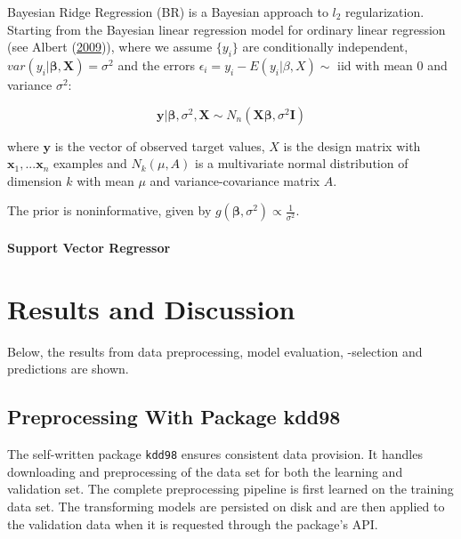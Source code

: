 \documentclass[
  11pt,
  a4paper,
  DIV=12,captions=tableheading,oneside,titlepage=firstiscover,abstracton]{scrreprt}
\begin{document}
Bayesian Ridge Regression (BR) is a Bayesian approach to \(l_2\) regularization. Starting from the Bayesian linear regression model for ordinary linear regression (see Albert (\protect\hyperlink{ref-albert2009bayesian}{2009})), where we assume \(\{y_i\}\) are conditionally independent, \(var(y_i|\mathbf{\beta},\mathbf{X}) = \sigma^2\) and the errors \(\epsilon_i = y_i - E(y_i|\beta,X) \sim\) iid with mean 0 and variance \(\sigma^2\):

\begin{equation}
\mathbf{y}|\mathbf{\beta},\sigma^2,\mathbf{X} \sim N_n(\mathbf{X \beta},\sigma^2 \mathbf{I})
\label{eq:bayesian-linear-model}
\end{equation}

where \(\mathbf{y}\) is the vector of observed target values, \(X\) is the design matrix with \(\mathbf{x}_1, ... \mathbf{x}_n\) examples and \(N_k(\mu, A)\) is a multivariate normal distribution of dimension \(k\) with mean \(\mu\) and variance-covariance matrix \(A\).

The prior is noninformative, given by \(g(\mathbf{\beta}, \sigma^2) \propto \frac{1}{\sigma^2}\).

\hypertarget{support-vector-regressor}{%
\subsubsection{Support Vector Regressor}\label{support-vector-regressor}}

\hypertarget{results-and-discussion}{%
\chapter{Results and Discussion}\label{results-and-discussion}}

Below, the results from data preprocessing, model evaluation, -selection and predictions are shown.

\hypertarget{preprocessing-with-package-kdd98}{%
\section{Preprocessing With Package kdd98}\label{preprocessing-with-package-kdd98}}

The self-written package \texttt{kdd98} ensures consistent data provision. It handles downloading and preprocessing of the data set for both the learning and validation set. The complete preprocessing pipeline is first learned on the training data set. The transforming models are persisted on disk and are then applied to the validation data when it is requested through the package's API.
\end{document}
